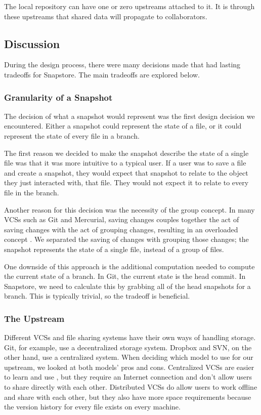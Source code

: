 The local repository can have one or zero upstreams attached to it. It is through these upstreams that shared data will propagate to collaborators.

\subsection{Discussion}

During the design process, there were many decisions made that had lasting tradeoffs for Snapstore. The main tradeoffs are explored below.

\subsubsection{Granularity of a Snapshot}

The decision of what a snapshot would represent was the first design decision we encountered. Either a snapshot could represent the state of a file, or it could represent the state of every file in a branch. 

The first reason we decided to make the snapshot describe the state of a single file was that it was more intuitive to a typical user. If a user was to save a file and create a snapshot, they would expect that snapshot to relate to the object they just interacted with, that file. They would not expect it to relate to every file in the branch.

Another reason for this decision was the necessity of the group concept. In many VCSs such as Git and Mercurial, saving changes couples together the act of saving changes with the act of grouping changes, resulting in an overloaded concept \cite{Jackson}. We separated the saving of changes with grouping those changes; the snapshot represents the state of a single file, instead of a group of files.

One downside of this approach is the additional computation needed to compute the current state of a branch. In Git, the current state is the head commit. In Snapstore, we need to calculate this by grabbing all of the head snapshots for a branch. This is typically trivial, so the tradeoff is beneficial.

\subsubsection{The Upstream}

Different VCSs and file sharing systems have their own ways of handling storage. Git, for example, use a decentralized storage system. Dropbox and SVN, on the other hand, use a centralized system. When deciding which model to use for our upstream, we looked at both models' pros and cons. Centralized VCSs are easier to learn and use \cite{Brindescu}, but they require an Internet connection and don't allow users to share directly with each other. Distributed VCSs do allow users to work offline and share with each other, but they also have more space requirements because the version history for every file exists on every machine.

